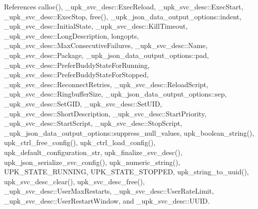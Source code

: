 References calloc(), \_\-upk\_\-svc\_\-desc::ExecReload, \_\-upk\_\-svc\_\-desc::ExecStart, \_\-upk\_\-svc\_\-desc::ExecStop, free(), \_\-upk\_\-json\_\-data\_\-output\_\-options::indent, \_\-upk\_\-svc\_\-desc::InitialState, \_\-upk\_\-svc\_\-desc::KillTimeout, \_\-upk\_\-svc\_\-desc::LongDescription, longopts, \_\-upk\_\-svc\_\-desc::MaxConsecutiveFailures, \_\-upk\_\-svc\_\-desc::Name, \_\-upk\_\-svc\_\-desc::Package, \_\-upk\_\-json\_\-data\_\-output\_\-options::pad, \_\-upk\_\-svc\_\-desc::PreferBuddyStateForRunning, \_\-upk\_\-svc\_\-desc::PreferBuddyStateForStopped, \_\-upk\_\-svc\_\-desc::ReconnectRetries, \_\-upk\_\-svc\_\-desc::ReloadScript, \_\-upk\_\-svc\_\-desc::RingbufferSize, \_\-upk\_\-json\_\-data\_\-output\_\-options::sep, \_\-upk\_\-svc\_\-desc::SetGID, \_\-upk\_\-svc\_\-desc::SetUID, \_\-upk\_\-svc\_\-desc::ShortDescription, \_\-upk\_\-svc\_\-desc::StartPriority, \_\-upk\_\-svc\_\-desc::StartScript, \_\-upk\_\-svc\_\-desc::StopScript, \_\-upk\_\-json\_\-data\_\-output\_\-options::suppress\_\-null\_\-values, upk\_\-boolean\_\-string(), upk\_\-ctrl\_\-free\_\-config(), upk\_\-ctrl\_\-load\_\-config(), upk\_\-default\_\-configuration\_\-str, upk\_\-finalize\_\-svc\_\-desc(), upk\_\-json\_\-serialize\_\-svc\_\-config(), upk\_\-numeric\_\-string(), UPK\_\-STATE\_\-RUNNING, UPK\_\-STATE\_\-STOPPED, upk\_\-string\_\-to\_\-uuid(), upk\_\-svc\_\-desc\_\-clear(), upk\_\-svc\_\-desc\_\-free(), \_\-upk\_\-svc\_\-desc::UserMaxRestarts, \_\-upk\_\-svc\_\-desc::UserRateLimit, \_\-upk\_\-svc\_\-desc::UserRestartWindow, and \_\-upk\_\-svc\_\-desc::UUID.



